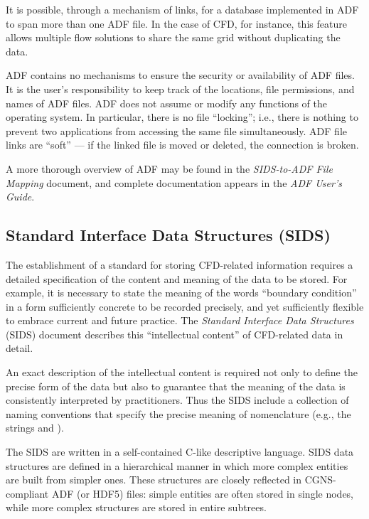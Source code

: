 It is possible, through a mechanism of links, for a database implemented
in ADF to span more than one ADF file.
In the case of CFD, for instance, this feature allows multiple flow
solutions to share the same grid without duplicating the data.

ADF contains no mechanisms to ensure the security or availability of ADF
files.
It is the user's responsibility to keep track of the locations, file
permissions, and names of ADF files.
ADF does not assume or modify any functions of the operating system.
In particular, there is no file ``locking''; i.e., there is nothing to
prevent two applications from accessing the same file simultaneously.
ADF file links are ``soft'' --- if the linked file is moved or deleted, the
connection is broken.

A more thorough overview of ADF may be found in the \textit{SIDS-to-ADF
File Mapping} document, and complete documentation appears in the
\textit{ADF User's Guide}.

\subsection{Standard Interface Data Structures (SIDS)}

The establishment of a standard for storing CFD-related information
requires a detailed specification of the content and meaning of the data
to be stored.
For example, it is necessary to state the meaning of the words ``boundary
condition'' in a form sufficiently concrete to be recorded precisely, and
yet sufficiently flexible to embrace current and future practice.
The \textit{Standard Interface Data Structures}
(SIDS) document describes this ``intellectual content'' of CFD-related
data in detail.

An exact description of the intellectual content is required not only
to define the precise form of the data but also to guarantee that the
meaning of the data is consistently interpreted by practitioners.
Thus the SIDS include a collection of naming conventions that
specify the precise meaning of nomenclature (e.g., the strings
 and ).

The SIDS are written in a self-contained C-like descriptive language.
SIDS data structures are defined in a hierarchical manner in which more
complex entities are built from simpler ones.
These structures are closely reflected in CGNS-compliant ADF (or HDF5)
files: simple entities are often stored in single nodes, while more
complex structures are stored in entire subtrees.

